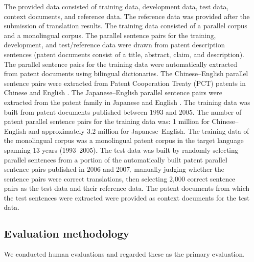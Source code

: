 \documentclass[english]{jnlp_1.4}
\begin{document}
The provided data consisted of training data, development data, test data, context documents, and reference data. 
The reference data was provided after the submission of translation results. 
The training data consisted of a parallel corpus and a monolingual corpus. 
The parallel sentence pairs for the training, development, and test/reference data were drawn from patent description sentences 
(patent documents consist of a title, abstract, claim, and description).
The parallel sentence pairs for the training data were automatically extracted from patent documents using bilingual dictionaries.
The Chinese--English parallel sentence pairs were extracted from Patent Cooperation Treaty (PCT) patents in Chinese and English
 \cite{Lu-EtAl:CLP2010}. 
The Japanese--English parallel sentence pairs were extracted from the patent family in Japanese and English
 \cite{Utiyama-Isahara:MTS2007}. 
The training data was built from patent documents published between 1993 and 2005.
The number of patent parallel sentence pairs for the training data was: 1 million for Chinese--English and approximately 3.2 million for Japanese--English.
The training data of the monolingual corpus was a monolingual patent corpus in the target language spanning 13 years (1993--2005).
The test data was built by randomly selecting parallel sentences from a portion of the automatically built patent parallel sentence pairs published in 2006 and 2007, 
manually judging whether the sentence pairs were correct translations, 
then selecting 2,000 correct sentence pairs as the test data and their reference data. 
The patent documents from which the test sentences were extracted were provided as context documents for the test data.


\subsection{Evaluation methodology}

We conducted human evaluations and regarded these as the primary evaluation.
\end{document}
